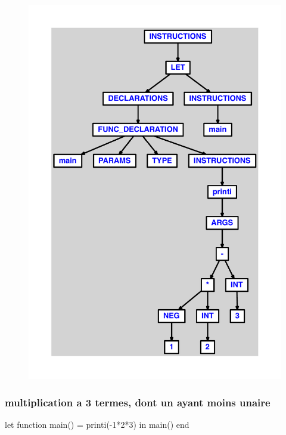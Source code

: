 \documentclass{article}
\begin{document}
\begin{figure}[H]\centering\includegraphics[max width=\textwidth]{ast/ast_72.pdf}\end{figure}\subsubsection{multiplication a 3 termes, dont un ayant moins unaire}
\begin{verbatimtab}
let
	function main() = printi(-1*2*3)
in main() end
\end{verbatimtab}
\end{document}
